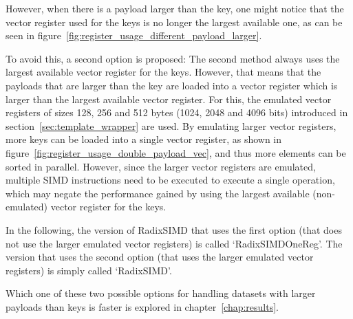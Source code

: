 \documentclass[12pt, a4paper, openright, twoside]{tiarbeit}
\begin{document}
However, when there is a payload larger than the key, one might notice that
the vector register used for the keys is no longer the largest available one,
as can be seen in figure~\ref{fig:register_usage_different_payload_larger}.

To avoid this, a second option is proposed:
The second method always uses the largest available vector register for the keys.
However, that means that the payloads that are larger than the key
are loaded into a vector register which
is larger than the largest available vector register.
For this, the emulated vector registers of sizes 128, 256 and 512 bytes
(1024, 2048 and 4096 bits) introduced in section~\ref{sec:template_wrapper}
are used.
By emulating larger vector registers, more keys can be loaded into a single
vector register, as shown in
figure~\ref{fig:register_usage_double_payload_vec}, and thus
more elements can be sorted in parallel.
However, since the larger vector registers are emulated, multiple SIMD instructions
need to be executed to execute a single operation, which may negate the performance
gained by using the largest available (non-emulated) vector register for the keys.

In the following, the version of RadixSIMD that uses the first option
(that does not use the larger emulated vector registers)
is called \mbox{`RadixSIMDOneReg'}.
The version that uses the second option (that uses the larger emulated vector registers)
is simply called \mbox{`RadixSIMD'}.

Which one of these two possible options for handling datasets with larger payloads
than keys is faster is explored in chapter~\ref{chap:results}.
\end{document}
